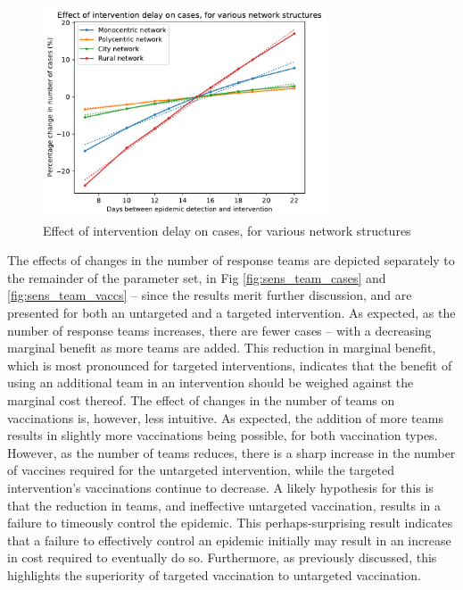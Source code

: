 \documentclass[10pt,letterpaper]{article}
\begin{document}
\begin{figure}[ht!]{\textwidth}
\begin{center}
    \includegraphics[width=0.75\textwidth]{figures/sensitivity/int_delay_plot.pdf}
    \caption{Effect of intervention delay on cases, for various network structures}
    \label{fig:sens_int_delay}
\end{center}
\end{figure}

The effects of changes in the number of response teams are depicted separately to the remainder of the parameter set, in Fig \ref{fig:sens_team_cases} and \ref{fig:sens_team_vaccs} -- since the results merit further discussion, and are presented for both an untargeted and a targeted intervention. As expected, as the number of response teams increases, there are fewer cases -- with a decreasing marginal benefit as more teams are added. This reduction in marginal benefit, which is most pronounced for targeted interventions, indicates that the benefit of using an additional team in an intervention should be weighed against the marginal cost thereof.
The effect of changes in the number of teams on vaccinations is, however, less intuitive. As expected, the addition of more teams results in slightly more vaccinations being possible, for both vaccination types. However, as the number of teams reduces, there is a sharp increase in the number of vaccines required for the untargeted intervention, while the targeted intervention's vaccinations continue to decrease. A likely hypothesis for this is that the reduction in teams, and ineffective untargeted vaccination, results in a failure to timeously control the epidemic. This perhaps-surprising result indicates that a failure to effectively control an epidemic initially may result in an increase in cost required to eventually do so. Furthermore, as previously discussed, this highlights the superiority of targeted vaccination to untargeted vaccination.
\end{document}
